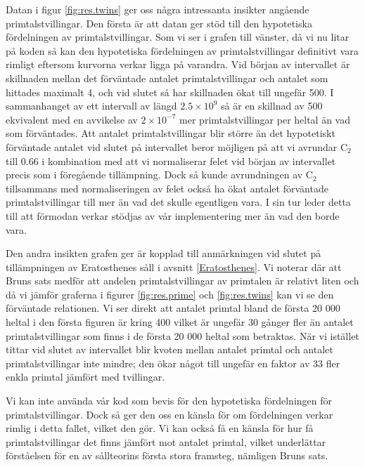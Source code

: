 Datan i figur \ref{fig:res.twins} ger oss några intressanta insikter angående primtalstvillingar. 
Den första är att datan ger stöd till den hypotetiska fördelningen av primtalstvillingar. 
Som vi ser i grafen till vänster, då vi nu litar på koden så kan den hypotetiska fördelningen av primtalstvillingar definitivt vara rimligt eftersom kurvorna verkar ligga på varandra.
Vid början av intervallet är skillnaden mellan det förväntade antalet primtalstvillingar och antalet som hittades maximalt 4, och vid slutet så har skillnaden ökat till ungefär 500.
I sammanhanget av ett intervall av längd \(2.5\times10^9\) så är en skillnad av 500 ekvivalent med en avvikelse av \(2\times 10^{-7}\) mer primtalstvillingar per heltal än vad som förväntades.
Att antalet primtalstvillingar blir större än det hypotetiskt förväntade antalet vid slutet på intervallet beror möjligen på att vi avrundar \(\text{C}_2\) till 0.66 i kombination med att vi normaliserar felet vid början av intervallet precis som i föregående tillämpning.
Dock så kunde avrundningen av \(\text{C}_2\) tillsammans med normaliseringen av felet också ha ökat antalet förväntade primtalstvillingar till mer än vad det skulle egentligen vara. 
I sin tur leder detta till att förmodan verkar stödjas av vår implementering mer än vad den borde vara.

Den andra insikten grafen ger är kopplad till anmärkningen vid slutet på tillämpningen av Eratosthenes såll i avsnitt \ref{Eratosthenes}.
Vi noterar där att Bruns sats medför att andelen primtalstvillingar av primtalen är relativt liten och då vi jämför graferna i figurer \ref{fig:res.prime} och \ref{fig:res.twins} kan vi se den förväntade relationen.
Vi ser direkt att antalet primtal bland de första 20 000 heltal i den första figuren är kring 400 vilket är ungefär 30 gånger fler än antalet primtalstvillingar som finns i de första 20 000 heltal som betraktas.
När vi istället tittar vid slutet av intervallet blir kvoten mellan antalet primtal och antalet primtalstvillingar inte mindre; den ökar något till ungefär en faktor av 33 fler enkla primtal jämfört med tvillingar.

Vi kan inte använda vår kod som bevis för den hypotetiska fördelningen för primtalstvillingar. 
Dock så ger den oss en känsla för om fördelningen verkar rimlig i detta fallet, vilket den gör. Vi kan också få en känsla för hur få primtalstvillingar det finns jämfört mot antalet primtal, vilket underlättar förståelsen för en av sållteorins första stora framsteg, nämligen Bruns sats.


